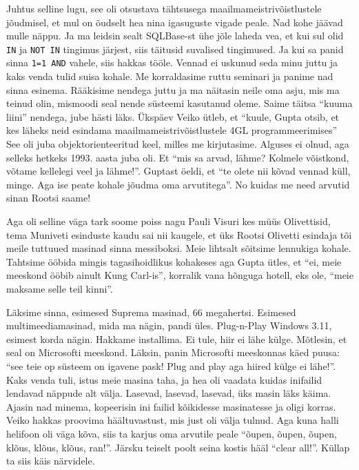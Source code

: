 Juhtus selline lugu, see oli otsustava tähtsusega maailmameistrivõistlustele jõudmisel, et  mul on õudselt hea nina igasuguste vigade peale. Nad kohe jäävad mulle näppu. Ja ma leidsin sealt SQLBase-st ühe jõle laheda vea, et kui sul olid \verb|IN| ja  \verb|NOT IN| tingimus järjest, siis täitusid suvalised tingimused. Ja kui sa panid sinna \verb|1=1 AND| vahele, siis hakkas tööle. Vennad ei uskunud seda minu juttu ja kaks venda tulid suisa kohale. Me korraldasime  ruttu seminari ja panime nad sinna esinema. Rääkisime nendega juttu ja ma näitasin neile oma asju, mis ma teinud olin, mismoodi seal nende süsteemi kasutanud oleme. Saime täitsa \enquote{kuuma liini} nendega, jube hästi läks. Ükspäev Veiko ütleb, et \enquote{kuule, Gupta otsib, et kes läheks neid esindama maailmameistrivõistlustele 4GL programmeerimises} See oli juba objektorienteeritud keel, milles me kirjutasime. Alguses ei olnud, aga selleks hetkeks 1993. aasta juba oli. Et \enquote{mis sa arvad, lähme? Kolmele võistkond, võtame kellelegi veel ja lähme!}. Guptast öeldi, et \enquote{te olete nii kõvad vennad küll, minge. Aga ise peate kohale jõudma oma arvutitega}. No kuidas me need arvutid sinan Rootsi saame! 

Aga oli selline väga tark soome poiss nagu Pauli Visuri kes müüs Olivettisid, tema Muniveti esinduste kaudu sai nii kaugele, et üks Rootsi Olivetti esindaja tõi meile tuttuued masinad sinna messiboksi. Meie lihtsalt sõitsime lennukiga kohale. Tahtsime ööbida mingis tagasihoidlikus kohakeses aga Gupta ütles, et \enquote{ei, meie meeskond ööbib ainult Kung Carl-is}, korralik vana hõnguga hotell, eks ole, \enquote{meie maksame selle teil kinni}. 

Läksime sinna, esimesed Suprema masinad, 66 megahertsi. Esimesed multimeediamasinad, mida  ma nägin, pandi üles. Plug-n-Play Windows 3.11, esimest korda nägin. Hakkame installima. Ei tule, hiir ei lähe külge. Mõtlesin, et seal on Microsofti meeskond. Läksin, panin Microsofti meeskonnas käed puusa: \enquote{see teie op süsteem on igavene pask! Plug and play aga hiired külge ei lähe!}. Kaks venda tuli, istus meie masina taha, ja hea oli vaadata kuidas inifailid lendavad näppude alt välja. Lasevad, lasevad, lasevad, üks masin läks käima. Ajasin nad minema, kopeerisin ini failid kõikidesse masinatesse ja oligi  korras.  Veiko hakkas proovima häältuvastust, mis just oli välja tulnud. Aga kuna halli helifoon oli väga kõva, siis ta karjus oma arvutile peale \enquote{õupen, õupen, õupen, klõus, klõus, klõus, ran!}. Järsku teiselt poolt seina kostis hääl \enquote{clear all!}. Küllap ta siis käis närvidele. 

